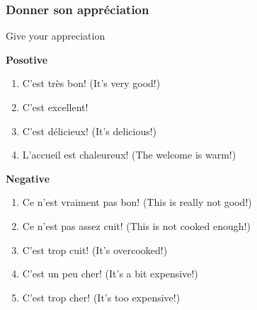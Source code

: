 \documentclass[10pt,a4paper,twoside]{article} %
\begin{document}
\subsubsection*{Donner son appréciation}
\begin{center}
    Give your appreciation
\end{center}
\textbf{Posotive}
\begin{enumerate}
    \item C'est très bon! (It's very good!)
    \item C'est excellent!
    \item C'est délicieux! (It's delicious!)
    \item L'accueil est chaleureux! (The welcome is warm!)
\end{enumerate}
\textbf{Negative}
\begin{enumerate}
    \item Ce n'est vraiment pas bon! (This is really not good!)
    \item Ce n'est pas assez cuit! (This is not cooked enough!)
    \item C'est trop cuit! (It's overcooked!)
    \item C'est un peu cher! (It's a bit expensive!)
    \item C'est trop cher! (It's too expensive!)
\end{enumerate}
\end{document}
